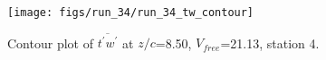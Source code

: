 \begin{figure}[H]
\centering
\texttt{[image: figs/run\_34/run\_34\_tw\_contour]}
\caption{Contour plot of $\overline{t^\prime w^\prime}$ at $z/c$=8.50, $V_{free}$=21.13, station 4.}
\label{fig:run_34_tw_contour}
\end{figure}


